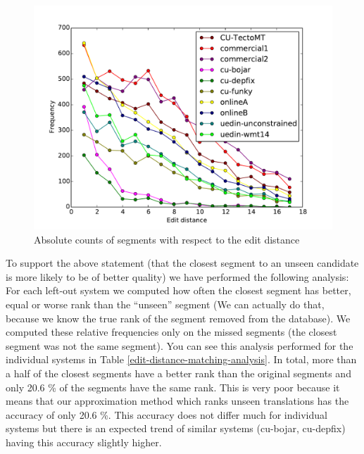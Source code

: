 \begin{figure}
    \begin{center}
        \includegraphics[width=14cm]{img/absolute-counts-per-distance.pdf}
    \end{center}

    \caption[Absolute counts of matched segments with respect to the edit distance]
    {Absolute counts of segments with respect to the edit distance}

    \label{absolute-counts-per-distance}
\end{figure}


To support the above statement (that the closest segment to an unseen candidate
is more likely to be of better quality) we have performed the following
analysis: For each left-out system we computed how often the closest segment
has better, equal or worse rank than the ``unseen'' segment (We can actually do
that, because we know the true rank of the segment removed from the database).
We computed these relative frequencies only on the missed segments (the closest
segment was not the same segment). You can see this analysis performed for the
individual systems in Table \ref{edit-distance-matching-analysis}.  In total,
more than a half of the closest segments have a better rank than the original
segments and only 20.6 \% of the segments have the same rank. This is very poor
because it means that our approximation method which ranks unseen translations
has the accuracy of only 20.6 \%. This accuracy does not differ much for
individual systems but there is an expected trend of similar systems (cu-bojar,
cu-depfix) having this accuracy slightly higher. 

